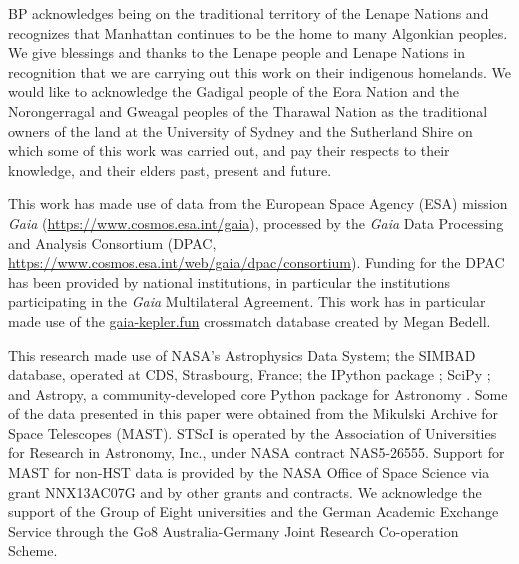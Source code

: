 \documentclass[a4paper,fleqn,usenatbib]{mnras}
\begin{document}
BP acknowledges being on the traditional territory of the Lenape Nations and recognizes that Manhattan continues to be the home to many Algonkian peoples. We give blessings and thanks to the Lenape people and Lenape Nations in recognition that we are carrying out this work on their indigenous homelands. We would like to acknowledge the Gadigal people of the Eora Nation and the Norongerragal and Gweagal peoples of the Tharawal Nation as the traditional owners of the land at the University of Sydney and the Sutherland Shire on which some of this work was carried out, and pay their respects to their knowledge, and their elders past, present and future.

This work has made use of data from the European Space Agency (ESA) mission
{\it Gaia} (\url{https://www.cosmos.esa.int/gaia}), processed by the {\it Gaia}
Data Processing and Analysis Consortium (DPAC,
\url{https://www.cosmos.esa.int/web/gaia/dpac/consortium}). Funding for the DPAC
has been provided by national institutions, in particular the institutions
participating in the {\it Gaia} Multilateral Agreement. This work has in particular made use of the \url{gaia-kepler.fun} crossmatch database created by Megan Bedell.

This research made use of NASA's Astrophysics Data System; the SIMBAD database, operated at CDS, Strasbourg, France; the IPython package \citep{PER-GRA:2007}; SciPy \citep{jones_scipy_2001}; and Astropy, a community-developed core Python package for Astronomy \citep{astropy}. Some of the data presented in this paper were obtained from the Mikulski Archive for Space Telescopes (MAST). STScI is operated by the Association of Universities for Research in Astronomy, Inc., under NASA contract NAS5-26555. Support for MAST for non-HST data is provided by the NASA Office of Space Science via grant NNX13AC07G and by other grants and contracts. We acknowledge the support of the Group of Eight universities and the German Academic Exchange Service through the Go8 Australia-Germany Joint Research Co-operation Scheme. 















\bsp	%
\label{lastpage}
\end{document}
